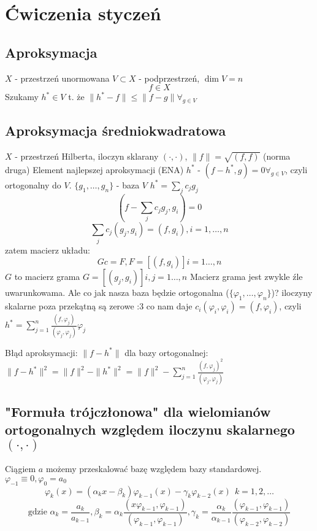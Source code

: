 \documentclass{article}
\begin{document}
\section{Ćwiczenia styczeń}
\subsection{Aproksymacja}
$X$ - przestrzeń unormowana
$V\subset X$ - podprzestrzeń, $ \dim V=n $
$$f\in X$$
Szukamy $h^*\in V$ t. że $ \|h^*-f\|\le \|f-g\|\forall_{g\in V} $
\subsection{Aproksymacja średniokwadratowa}
$ X $ - przestrzeń Hilberta, iloczyn sklarany $(\cdot, \cdot)$, $ \|f\|=\sqrt{(f, f)} $ (norma druga)
Element najlepszej aproksymacji (ENA) $ h^* $ - $ (f-h^*,g)=0 \forall_{g\in V} $, czyli ortogonalny do $ V $.
$ \{g_1, \dots, g_n\} $ - baza $ V $
$ h^*=\sum_j c_j g_j $
$$(f-\sum_j c_j g_j, g_i)=0$$
$$\sum_j c_j(g_j, g_i)=(f, g_i), i=1,\dots,n$$
zatem macierz układu:
$$Gc=F, F=[(f,g_i)]i=1\dots,n$$
$ G $ to macierz grama $ G=[(g_j,g_i)]i,j=1\dots,n $
Macierz grama jest zwykle źle uwarunkowama. Ale co jak nasza baza będzie ortogonalna ($ \{\varphi_1, \dots, \varphi_n\} $)? iloczyny skalarne poza przekątną są zerowe :3
co nam daje $ c_i(\varphi_i, \varphi_i)=(f, \varphi_i) $, czyli $ h^*=\sum_{j=1}^n \frac{(f,\varphi_j)}{(\varphi_j, \varphi_j)}\varphi_j$

Błąd aproksymacji: $ \|f-h^*\| $
dla bazy ortogonalnej:
$\|f-h^*\|^2=\|f\|^2-\|h^*\|^2=\|f\|^2-\sum_{j=1}^n \frac{(f,\varphi_j)^2}{(\varphi_j, \varphi_j)}$
\subsection{"Formuła trójczłonowa" dla wielomianów ortogonalnych względem iloczynu skalarnego $ (\cdot, \cdot) $}
Ciągiem $ a $ możemy przeskalować bazę względem bazy standardowej.\\
$\varphi_{-1}\equiv0,\varphi_0=a_0$
$$\varphi_k(x)=(\alpha_kx-\beta_k)\varphi_{k-1}(x)-\gamma_k\varphi_{k-2}(x)\ \  k=1,2,\dots$$
$$\text{gdzie } \alpha_k=\frac{a_k}{a_{k-1}}, \beta_k=\alpha_k\frac{(x\varphi_{k-1},\varphi_{k-1})}{(\varphi_{k-1},\varphi_{k-1})}, \gamma_k=\frac{\alpha_k}{\alpha_{k-1}}\frac{(\varphi_{k-1},\varphi_{k-1})}{(\varphi_{k-2},\varphi_{k-2})}$$
\end{document}
